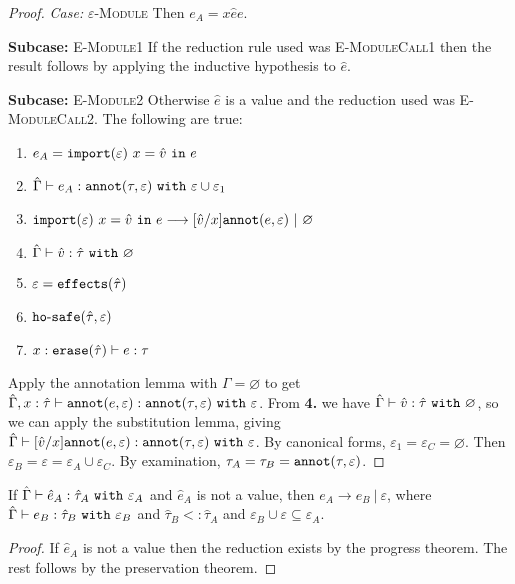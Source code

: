 \begin{appendix}
\begin{proof}
\textit{Case:} \textsc{$\varepsilon$-Module}
Then $e_A = {x}{\hat e}{e}$.

\textbf{Subcase:} \textsc{E-Module1} If the reduction rule used was \textsc{E-ModuleCall1} then the result follows by applying the inductive hypothesis to $\hat e$.

\textbf{Subcase:} \textsc{E-Module2} Otherwise $\hat e$ is a value and the reduction used was \textsc{E-ModuleCall2}. The following are true:
\begin{enumerate}
	\setlength\itemsep{-0.7em}
	\item $e_A = \mathtt{import}(\varepsilon)~x = \hat v~\mathtt{in}~ e$
	\item $\hat \Gamma \vdash e_A: \mathtt{annot}(\tau, \varepsilon)~\mathtt{with}~ \varepsilon \cup \varepsilon_1$
	\item $\mathtt{import}(\varepsilon)~x = \hat v~\mathtt{in}~ e \longrightarrow [\hat v/x]\mathtt{annot}(e, \varepsilon)~|~\varnothing$
	\item $\hat \Gamma \vdash \hat v: \hat \tau~\mathtt{with}~ \varnothing$
	\item $\varepsilon = \mathtt{effects}(\hat \tau)$
	\item $\mathtt{ho \hbox{-} safe}(\hat \tau, \varepsilon)$
	\item $x: \mathtt{erase}(\hat \tau) \vdash e: \tau$
\end{enumerate}

Apply the annotation lemma with $\Gamma = \varnothing$ to get $\hat \Gamma, x: \hat \tau \vdash \mathtt{annot}(e, \varepsilon): \mathtt{annot}(\tau, \varepsilon)~\mathtt{with}~ \varepsilon$. From \textbf{4.} we have $\hat \Gamma \vdash \hat v: \hat \tau~\mathtt{with}~ \varnothing$, so we can apply the substitution lemma, giving $\hat \Gamma \vdash [\hat v/x]\mathtt{annot}(e, \varepsilon): \mathtt{annot}(\tau, \varepsilon)~\mathtt{with}~ \varepsilon$. By canonical forms, $\varepsilon_1 = \varepsilon_C = \varnothing$. Then $\varepsilon_B = \varepsilon = \varepsilon_A \cup \varepsilon_C$. By examination, $\tau_A = \tau_B = \mathtt{annot}(\tau, \varepsilon)$.

\end{proof}

\hrulefill

\begin{theorem}[Soundness]
If $\hat \Gamma \vdash \hat e_A: \hat \tau_A~\mathtt{with}~ \varepsilon_A$ and $\hat e_A$ is not a value, then $e_A \longrightarrow e_B~|~\varepsilon$, where $\hat \Gamma \vdash e_B: \hat \tau_B~\mathtt{with}~ \varepsilon_B$ and $\hat \tau_B <: \hat \tau_A$ and $\varepsilon_B \cup \varepsilon \subseteq \varepsilon_A$.
\end{theorem}
\begin{proof}
If $\hat e_A$ is not a value then the reduction exists by the progress theorem. The rest follows by the preservation theorem.
\end{proof}


\end{appendix}

